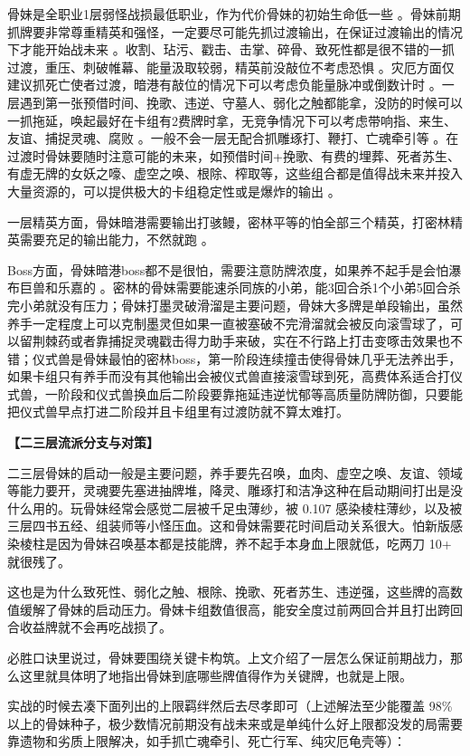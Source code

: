 \documentclass[12pt, a4paper]{article}
\begin{document}
骨妹是全职业1层弱怪战损最低职业，作为代价骨妹的初始生命低一些 。骨妹前期抓牌要非常尊重精英和强怪，一定要尽可能先抓过渡输出，在保证过渡输出的情况下才能开始战未来 。收割、玷污、戳击、击掌、碎骨、致死性都是很不错的一抓过渡，重压、刺破帷幕、能量汲取较弱，精英前没敲位不考虑恐惧 。灾厄方面仅建议抓死亡使者过渡，暗港有敲位的情况下可以考虑负能量脉冲或倒数计时 。一层遇到第一张预借时间、挽歌、违逆、守墓人、弱化之触都能拿，没防的时候可以一抓拖延，唤起最好在卡组有2费牌时拿，无竞争情况下可以考虑带响指、来生、友谊、捕捉灵魂、腐败 。一般不会一层无配合抓雕琢打、鞭打、亡魂牵引等 。在过渡时骨妹要随时注意可能的未来，如预借时间+挽歌、有费的埋葬、死者苏生、有虚无牌的女妖之嚎、虚空之唤、根除、榨取等，这些组合都是值得战未来并投入大量资源的，可以提供极大的卡组稳定性或是爆炸的输出 。

一层精英方面，骨妹暗港需要输出打骇鳗，密林平等的怕全部三个精英，打密林精英需要充足的输出能力，不然就跑 。

Boss方面，骨妹暗港boss都不是很怕，需要注意防牌浓度，如果养不起手是会怕瀑布巨兽和乐嘉的 。密林的骨妹需要能速杀同族的小弟，能3回合杀1个小弟5回合杀完小弟就没有压力；骨妹打墨灵破滑溜是主要问题，骨妹大多牌是单段输出，虽然养手一定程度上可以克制墨灵但如果一直被塞破不完滑溜就会被反向滚雪球了，可以留荆棘药或者靠捕捉灵魂戳击得力助手来破，实在不行路上打击变啄击效果也不错；仪式兽是骨妹最怕的密林boss，第一阶段连续撞击使得骨妹几乎无法养出手，如果卡组只有养手而没有其他输出会被仪式兽直接滚雪球到死，高费体系适合打仪式兽，一阶段和仪式兽换血后二阶段要靠拖延违逆忧郁等高质量防牌防御，只要能把仪式兽早点打进二阶段并且卡组里有过渡防就不算太难打。

\textbf{【二三层流派分支与对策】}

二三层骨妹的启动一般是主要问题，养手要先召唤，血肉、虚空之唤、友谊、领域等能力要开，灵魂要先塞进抽牌堆，降灵、雕琢打和洁净这种在启动期间打出是没什么用的。玩骨妹经常会感觉二层被千足虫薄纱，被 0.107 感染棱柱薄纱，以及被三层四书五经、组装师等小怪压血。这和骨妹需要花时间启动关系很大。怕新版感染棱柱是因为骨妹召唤基本都是技能牌，养不起手本身血上限就低，吃两刀 10+ 就很残了。

这也是为什么致死性、弱化之触、根除、挽歌、死者苏生、违逆强，这些牌的高数值缓解了骨妹的启动压力。骨妹卡组数值很高，能安全度过前两回合并且打出跨回合收益牌就不会再吃战损了。

必胜口诀里说过，骨妹要围绕关键卡构筑。上文介绍了一层怎么保证前期战力，那么这里就具体明了地指出骨妹到底哪些牌值得作为关键牌，也就是上限。

实战的时候去凑下面列出的上限羁绊然后去尽孝即可（上述解法至少能覆盖 98\% 以上的骨妹种子，极少数情况前期没有战未来或是单纯什么好上限都没发的局需要靠遗物和劣质上限解决，如手抓亡魂牵引、死亡行军、纯灾厄龟壳等）：
\end{document}

